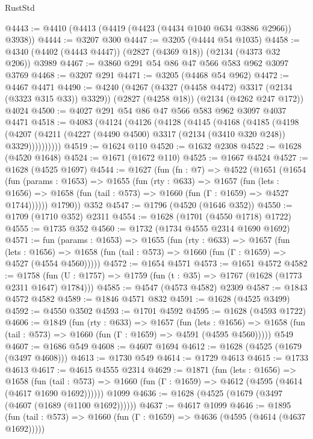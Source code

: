 \begin{lexlean}{RustStd}
\begin{coremodule}
@4443 := @4410 (@4413 (@4419 (@4423 (@4434 @1040 @634 @3886 @2966)) @3938))
@4444 := @3207 @300
@4447 := @3205 (@4444 @54 @1035)
@4458 := @4340 (@4402 (@4443 @4447)) (@2827 (@4369 @18)) (@2134 (@4373 @32 @206)) @3989
@4467 := @3860 @291 @54 @86 @47 @566 @583 @962 @3097 @3769
@4468 := @3207 @291
@4471 := @3205 (@4468 @54 @962)
@4472 := @4467 @4471
@4490 := @4240
    (@4267 (@4327 (@4458 @4472) @3317 (@2134 (@3323 @315 @33)) @3329))
    (@2827 (@4258 @18))
    (@2134 (@4262 @247 @172))
    @4024
@4500 := @4027 @291 @54 @86 @47 @566 @583 @962 @3097 @4037 @4471
@4518 := @4083
    (@4124
      (@4126
        (@4128
          (@4145
            (@4168
              (@4185
                (@4198
                  (@4207 (@4211 (@4227 (@4490 @4500) @3317 (@2134 (@3410 @320 @248)) @3329))))))))))
@4519 := @1624 @110
@4520 := @1632 @2308
@4522 := @1628 (@4520 @1648)
@4524 := @1671 (@1672 @110)
@4525 := @1667 @4524
@4527 := @1628 (@4525 @1697)
@4544 := @1627
    (fun (fn : @7) =>
    @4522
      (@1651
        (@1654
          (fun (params : @1653) =>
          @1655
            (fun (rty : @633) =>
            @1657
              (fun (lets : @1656) =>
              @1658 (fun (tail : @573) => @1660 (fun (Γ : @1659) => @4527 @1744))))))
        @1790))
    @352
@4547 := @1796 (@4520 (@1646 @352))
@4550 := @1709 (@1710 @352) @2311
@4554 := @1628 (@1701 (@4550 @1718) @1722)
@4555 := @1735 @352
@4560 := @1732 (@1734 @4555 @2314 @1690 @1692)
@4571 := fun (params : @1653) =>
  @1655
    (fun (rty : @633) =>
    @1657
      (fun (lets : @1656) =>
      @1658 (fun (tail : @573) => @1660 (fun (Γ : @1659) => @4527 (@4554 @4560)))))
@4572 := @1654 @4571
@4573 := @1651 @4572
@4582 := @1758 (fun (U : @1757) => @1759 (fun (t : @35) => @1767 (@1628 (@1773 @2311 @1647) @1784)))
@4585 := @4547 (@4573 @4582) @2309
@4587 := @1843 @4572 @4582
@4589 := @1846 @4571 @832
@4591 := @1628 (@4525 @3499)
@4592 := @4550 @3502
@4593 := @1701 @4592
@4595 := @1628 (@4593 @1722)
@4606 := @1849
    (fun (rty : @633) =>
    @1657
      (fun (lets : @1656) =>
      @1658 (fun (tail : @573) => @1660 (fun (Γ : @1659) => @4591 (@4595 @4560)))))
    @549
@4607 := @1686 @549
@4608 := @4607 @1694
@4612 := @1628 (@4525 (@1679 (@3497 @4608)))
@4613 := @1730 @549
@4614 := @1729 @4613
@4615 := @1733 @4613
@4617 := @4615 @4555 @2314
@4629 := @1871
    (fun (lets : @1656) =>
    @1658
      (fun (tail : @573) => @1660 (fun (Γ : @1659) => @4612 (@4595 (@4614 (@4617 @1690 @1692))))))
    @1099
@4636 := @1628 (@4525 (@1679 (@3497 (@4607 (@1689 (@1100 @1692))))))
@4637 := @4617 @1099
@4646 := @1895
    (fun (tail : @573) => @1660 (fun (Γ : @1659) => @4636 (@4595 (@4614 (@4637 @1692)))))

\end{coremodule}
\end{lexlean}
